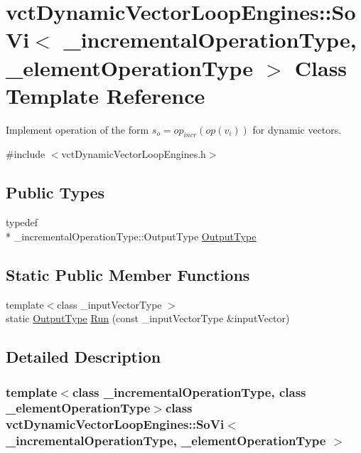 \hypertarget{classvct_dynamic_vector_loop_engines_1_1_so_vi}{\section{vct\-Dynamic\-Vector\-Loop\-Engines\-:\-:So\-Vi$<$ \-\_\-incremental\-Operation\-Type, \-\_\-element\-Operation\-Type $>$ Class Template Reference}
\label{classvct_dynamic_vector_loop_engines_1_1_so_vi}
}


Implement operation of the form $s_o = op_{incr}(op(v_i))$ for dynamic vectors.  




{\ttfamily \#include $<$vct\-Dynamic\-Vector\-Loop\-Engines.\-h$>$}

\subsection*{Public Types}
\begin{DoxyCompactItemize}
\item 
typedef \\*
\-\_\-incremental\-Operation\-Type\-::\-Output\-Type \hyperlink{classvct_dynamic_vector_loop_engines_1_1_so_vi_a0e42560add0a15a5c8722aee8a9aa78c}{Output\-Type}
\end{DoxyCompactItemize}
\subsection*{Static Public Member Functions}
\begin{DoxyCompactItemize}
\item 
{\footnotesize template$<$class \-\_\-input\-Vector\-Type $>$ }\\static \hyperlink{classvct_dynamic_vector_loop_engines_1_1_so_vi_a0e42560add0a15a5c8722aee8a9aa78c}{Output\-Type} \hyperlink{classvct_dynamic_vector_loop_engines_1_1_so_vi_af025608cd64ae1471ffeb1ef6f842631}{Run} (const \-\_\-input\-Vector\-Type \&input\-Vector)
\end{DoxyCompactItemize}


\subsection{Detailed Description}
\subsubsection*{template$<$class \-\_\-incremental\-Operation\-Type, class \-\_\-element\-Operation\-Type$>$class vct\-Dynamic\-Vector\-Loop\-Engines\-::\-So\-Vi$<$ \-\_\-incremental\-Operation\-Type, \-\_\-element\-Operation\-Type $>$}

